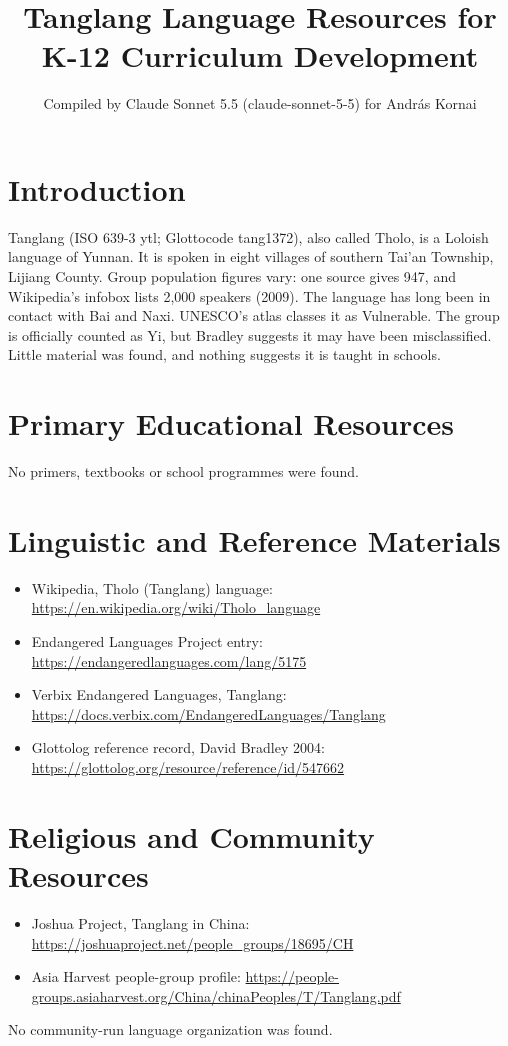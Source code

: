 \documentclass[12pt]{article}
\title{Tanglang Language Resources for K-12 Curriculum Development}
\author{Compiled by Claude Sonnet 5.5 (claude-sonnet-5-5) for Andr\'as Kornai}
\date{}
\begin{document}
\maketitle

\section{Introduction}
Tanglang (ISO 639-3 ytl; Glottocode tang1372), also called Tholo, is a Loloish language of Yunnan. It is spoken in eight villages of southern Tai'an Township, Lijiang County. Group population figures vary: one source gives 947, and Wikipedia's infobox lists 2,000 speakers (2009). The language has long been in contact with Bai and Naxi. UNESCO's atlas classes it as Vulnerable. The group is officially counted as Yi, but Bradley suggests it may have been misclassified. Little material was found, and nothing suggests it is taught in schools.

\section{Primary Educational Resources}
No primers, textbooks or school programmes were found.

\section{Linguistic and Reference Materials}
\begin{itemize}
\item Wikipedia, Tholo (Tanglang) language: \url{https://en.wikipedia.org/wiki/Tholo_language}
\item Endangered Languages Project entry: \url{https://endangeredlanguages.com/lang/5175}
\item Verbix Endangered Languages, Tanglang: \url{https://docs.verbix.com/EndangeredLanguages/Tanglang}
\item Glottolog reference record, David Bradley 2004: \url{https://glottolog.org/resource/reference/id/547662}
\end{itemize}

\section{Religious and Community Resources}
\begin{itemize}
\item Joshua Project, Tanglang in China: \url{https://joshuaproject.net/people_groups/18695/CH}
\item Asia Harvest people-group profile: \url{https://people-groups.asiaharvest.org/China/chinaPeoples/T/Tanglang.pdf}
\end{itemize}
No community-run language organization was found.
\end{document}
